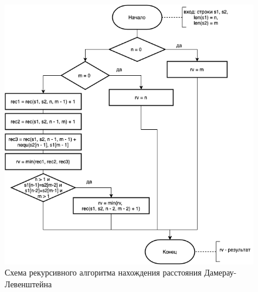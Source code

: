 \documentclass{report}
\begin{document}
\begin{figure}[h!p]\label{recDam}
	\centering
	\includegraphics[scale = 0.7]{recDamLev.drawio.png}
	\caption{Схема рекурсивного алгоритма нахождения расстояния Дамерау-Левенштейна}
	\label{fig:mpr4}
\end{figure}
\end{document}
